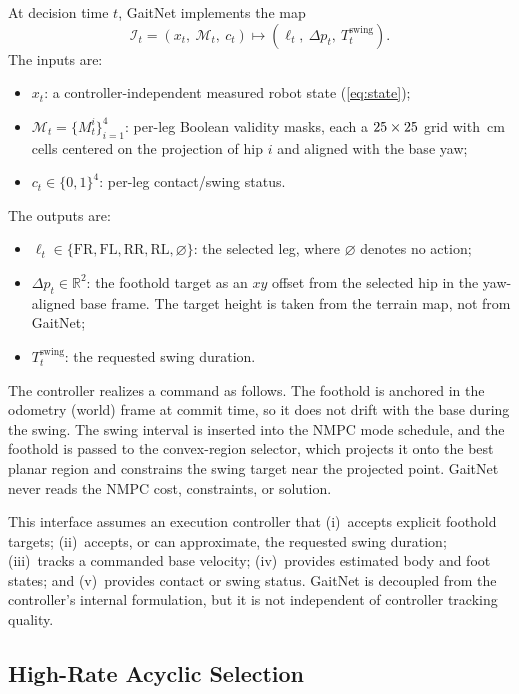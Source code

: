 At decision time $t$, GaitNet implements the map
\begin{equation}
  \mathcal I_t = \left(x_t,\ \mathcal M_t,\ c_t\right)
  \longmapsto
  \left(\ell_t,\ \Delta p_t,\ T^{\mathrm{swing}}_t\right).
  \label{eq:interface}
\end{equation}
The inputs are:
\begin{itemize}
  \item $x_t$: a controller-independent measured robot state
    (\autoref{eq:state});
  \item $\mathcal M_t = \{M^{i}_t\}_{i=1}^{4}$: per-leg Boolean
    validity masks, each a $25\times25$ grid
    with \corlMaskResolutionCm\,cm cells centered on the projection of
    hip $i$ and aligned with the base yaw;
  \item $c_t\in\{0,1\}^{4}$: per-leg contact/swing status.
\end{itemize}
The outputs are:
\begin{itemize}
  \item $\ell_t \in \{\mathrm{FR},\mathrm{FL},\mathrm{RR},\mathrm{RL},
    \varnothing\}$: the selected leg, where $\varnothing$ denotes no
    action;
  \item $\Delta p_t \in \mathbb R^2$: the foothold target as an $xy$
    offset from the selected hip in the yaw-aligned base frame. The
    target height is taken from the terrain map, not from GaitNet;
  \item $T^{\mathrm{swing}}_t$: the requested swing duration.
\end{itemize}

The controller realizes a command as follows. The foothold is anchored
in the odometry (world) frame at commit time, so it does not drift
with the base during the swing. The swing interval is inserted into
the NMPC mode schedule, and the foothold is passed to the
convex-region selector, which projects it onto the best planar region
and constrains the swing target near the projected point. GaitNet
never reads the NMPC cost, constraints, or solution.

This interface assumes an execution controller that
(i)~accepts explicit foothold targets; (ii)~accepts, or can
approximate, the requested swing duration; (iii)~tracks a commanded
base velocity; (iv)~provides estimated body and foot states; and
(v)~provides contact or swing status. GaitNet is decoupled from the
controller's internal formulation, but it is not independent of
controller tracking quality.

\subsection{High-Rate Acyclic Selection}
\label{subsec:method-selection}

